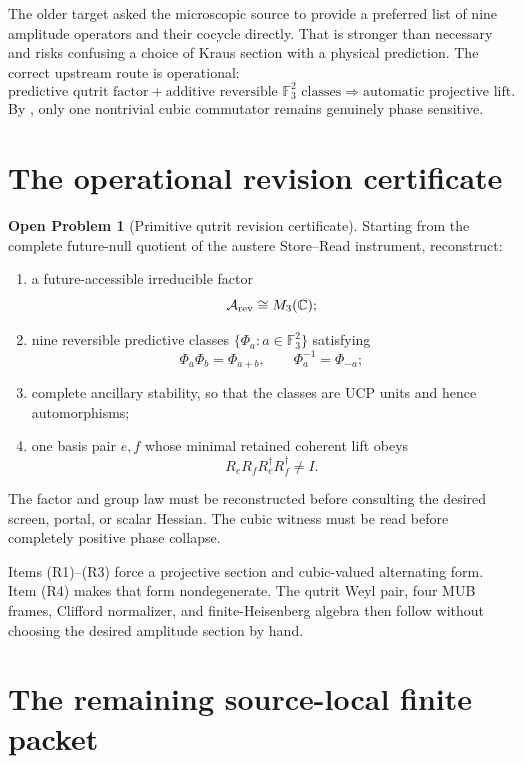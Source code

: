\documentclass[11pt,oneside,openany]{book}
\numberwithin{equation}{chapter}
\theoremstyle{definition}
\newtheorem{openproblem}[theorem]{Open Problem}
\theoremstyle{remark}
\newcommand{\C}{\mathbb C}
\begin{document}
The older target asked the microscopic source to provide a preferred list of
nine amplitude operators and their cocycle directly.  That is stronger than
necessary and risks confusing a choice of Kraus section with a physical
prediction.  The correct upstream route is operational:
\[
 \boxed{
 \text{predictive qutrit factor}
 +
 \text{additive reversible }\mathbb F_3^2\text{ classes}
 \Longrightarrow
 \text{automatic projective lift}.}
\]
By , only one nontrivial cubic commutator
remains genuinely phase sensitive.

\section{The operational revision certificate}

\begin{openproblem}[Primitive qutrit revision certificate]
\label{op:primitive-odd}
Starting from the complete future-null quotient of the austere Store--Read
instrument, reconstruct:
\begin{enumerate}[label=\textup{(R\arabic*)},leftmargin=2.8em]
\item a future-accessible irreducible factor
      \[
       \mathcal A_{\rm rev}\cong M_3(\C);
      \]
\item nine reversible predictive classes
      \(\{\Phi_a:a\in\mathbb F_3^2\}\) satisfying
      \[
       \Phi_a\Phi_b=\Phi_{a+b},
       \qquad
       \Phi_a^{-1}=\Phi_{-a};
      \]
\item complete ancillary stability, so that the classes are UCP units and
      hence automorphisms;
\item one basis pair \(e,f\) whose minimal retained coherent lift obeys
      \[
       \boxed{
       R_eR_fR_e^\dagger R_f^\dagger\ne I.}
      \]
\end{enumerate}
The factor and group law must be reconstructed before consulting the desired
screen, portal, or scalar Hessian.  The cubic witness must be read before
completely positive phase collapse.
\end{openproblem}

Items (R1)--(R3) force a projective section and cubic-valued alternating form.
Item (R4) makes that form nondegenerate.  The qutrit Weyl pair, four MUB
frames, Clifford normalizer, and finite-Heisenberg algebra then follow without
choosing the desired amplitude section by hand.

\section{The remaining source-local finite packet}
\end{document}
